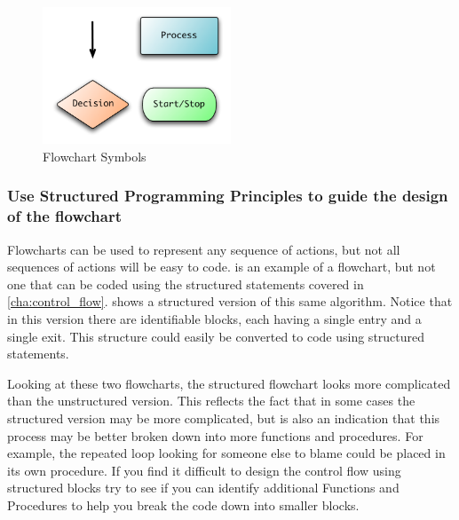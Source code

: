 \begin{figure}[htbp]
   \centering
   \includegraphics[width=0.5\textwidth]{./topics/control-flow/diagrams/FlowParts} 
   \caption{Flowchart Symbols}
   \label{fig:flow-symbols}
\end{figure}


\clearpage
\subsubsection{Use Structured Programming Principles to guide the design of the flowchart} %
\label{ssub:structured_programming}

Flowcharts can be used to represent any sequence of actions, but not all sequences of actions will be easy to code.  is an example of a flowchart, but not one that can be coded using the structured statements covered in \cref{cha:control_flow}.  shows a structured version of this same algorithm. Notice that in this version there are identifiable blocks, each having a single entry and a single exit. This structure could easily be converted to code using structured statements. 

Looking at these two flowcharts, the structured flowchart looks more complicated than the unstructured version. This reflects the fact that in some cases the structured version may be more complicated, but is also an indication that this process may be better broken down into more functions and procedures. For example, the repeated loop looking for someone else to blame could be placed in its own procedure. If you find it difficult to design the control flow using structured blocks try to see if you can identify additional Functions and Procedures to help you break the code down into smaller blocks. 

